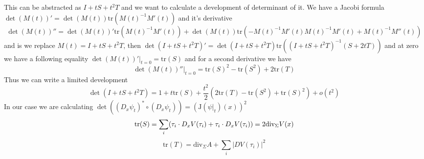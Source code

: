 This can be abstracted as $I+tS+t^2T$ and we want to calculate a development
of determinant of it. We have a Jacobi formula $\det(M(t))'=\det(M(t))\text{tr}
(M(t)^{-1}M'(t))$ and it's derivative
\[\det(M(t))''=\det(M(t))'\text{tr}(M(t)^{-1}M'(t))+\det(M(t))\text{tr}(-M(t)^
{-1}M'(t)M(t)^{-1}M'(t)+M(t)^{-1}M''(t))\]
and is we replace $M(t)=I+tS+t^2T$, then $\det(I+tS+t^2T)'=\det(I+tS+t^2T)\text{tr}
((I+tS+t^2T)^{-1}(S+2tT))$ and at zero we have a following equality
$\det(M(t))'|_{t=0}=\text{tr}(S)$ and for a second derivative we have
\[\det(M(t))''|_{t=0}=\text{tr}(S)^2-\text{tr}(S^2)+2\text{tr}(T)\]
Thus we can write a limited development
\[\det(I+tS+t^2T)=1+t\text{tr}(S)+\frac{t^2}{2}(2\text{tr}(T)-\text{tr}(S^2)+\text{tr}(S)^2)+o(t^2)\]
In our case we are calculating $\det((D_x\psi_t)^*\circ(D_x\psi_t))=(\text{J}(\psi|_t)(x))^2$
\[
    \text{tr}(S)=\sum_i(\tau_i\cdot D_xV(\tau_i)+\tau_i\cdot D_xV(\tau_i))=2\text{div}_\Sigma V(x)\\
\]
\[
    \text{tr}(T)=\text{div}_\Sigma A+\sum_i|DV(\tau_i)|^2
\]

